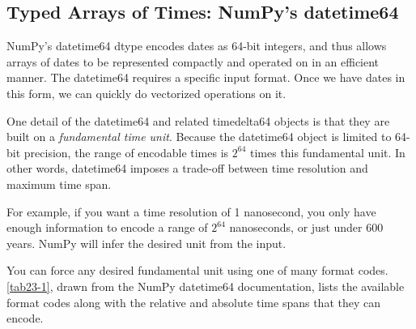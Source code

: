 \subsection*{Typed Arrays of Times: NumPy's datetime64}
NumPy's datetime64 dtype encodes dates as 64-bit integers, and thus allows arrays of
dates to be represented compactly and operated on in an efficient manner. The
datetime64 requires a specific input format. Once we have dates in this form, we can quickly do vectorized operations on it.

One detail of the datetime64 and related timedelta64 objects is that they are built on
a \emph{fundamental time unit}. Because the datetime64 object is limited to 64-bit precision,
the range of encodable times is $2^{64}$ times this fundamental unit. In other words,
datetime64 imposes a trade-off between time resolution and maximum time span.

For example, if you want a time resolution of 1 nanosecond, you only have enough
information to encode a range of $2^{64}$ nanoseconds, or just under 600 years. NumPy
will infer the desired unit from the input.

You can force any desired fundamental unit using one of many format codes. \autoref{tab23-1}, drawn from the NumPy datetime64 documentation, lists the available
format codes along with the relative and absolute time spans that they can encode.

